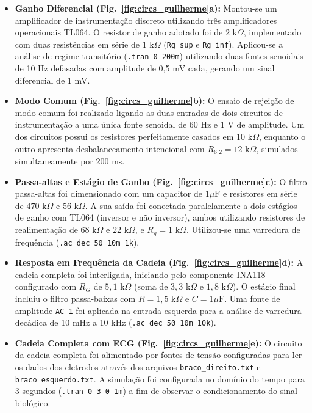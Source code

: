 \documentclass[11pt,a4paper]{article}
\begin{document}
\begin{itemize}
    \item \textbf{Ganho Diferencial (Fig.~\ref{fig:circs_guilherme}a):} Montou-se um amplificador de instrumentação discreto utilizando três amplificadores operacionais TL064. O resistor de ganho adotado foi de $2\text{ k}\Omega$, implementado com duas resistências em série de $1\text{ k}\Omega$ (\texttt{Rg\_sup} e \texttt{Rg\_inf}). Aplicou-se a análise de regime transitório (\texttt{.tran 0 200m}) utilizando duas fontes senoidais de 10 Hz defasadas com amplitude de 0,5 mV cada, gerando um sinal diferencial de 1 mV.
    
    \item \textbf{Modo Comum (Fig.~\ref{fig:circs_guilherme}b):} O ensaio de rejeição de modo comum foi realizado ligando as duas entradas de dois circuitos de instrumentação a uma única fonte senoidal de 60 Hz e 1 V de amplitude. Um dos circuitos possui os resistores perfeitamente casados em $10\text{ k}\Omega$, enquanto o outro apresenta desbalanceamento intencional com $R_{6\_2}=12\text{ k}\Omega$, simulados simultaneamente por 200 ms.

    \item \textbf{Passa-altas e Estágio de Ganho (Fig.~\ref{fig:circs_guilherme}c):} O filtro passa-altas foi dimensionado com um capacitor de $1\mu\text{F}$ e resistores em série de $470\text{ k}\Omega$ e $56\text{ k}\Omega$. A sua saída foi conectada paralelamente a dois estágios de ganho com TL064 (inversor e não inversor), ambos utilizando resistores de realimentação de $68\text{ k}\Omega$ e $22\text{ k}\Omega$, e $R_g=1\text{ k}\Omega$. Utilizou-se uma varredura de frequência (\texttt{.ac dec 50 10m 1k}).
    
    \item \textbf{Resposta em Frequência da Cadeia (Fig.~\ref{fig:circs_guilherme}d):} A cadeia completa foi interligada, iniciando pelo componente INA118 configurado com $R_G$ de $5{,}1\text{ k}\Omega$ (soma de $3{,}3\text{ k}\Omega$ e $1{,}8\text{ k}\Omega$). O estágio final incluiu o filtro passa-baixas com $R=1{,}5\text{ k}\Omega$ e $C=1\mu\text{F}$. Uma fonte de amplitude \texttt{AC 1} foi aplicada na entrada esquerda para a análise de varredura decádica de 10 mHz a 10 kHz (\texttt{.ac dec 50 10m 10k}).

    \item \textbf{Cadeia Completa com ECG (Fig.~\ref{fig:circs_guilherme}e):} O circuito da cadeia completa foi alimentado por fontes de tensão configuradas para ler os dados dos eletrodos através dos arquivos \texttt{braco\_direito.txt} e \texttt{braco\_esquerdo.txt}. A simulação foi configurada no domínio do tempo para 3 segundos (\texttt{.tran 0 3 0 1m}) a fim de observar o condicionamento do sinal biológico.


\end{itemize}
\end{document}
